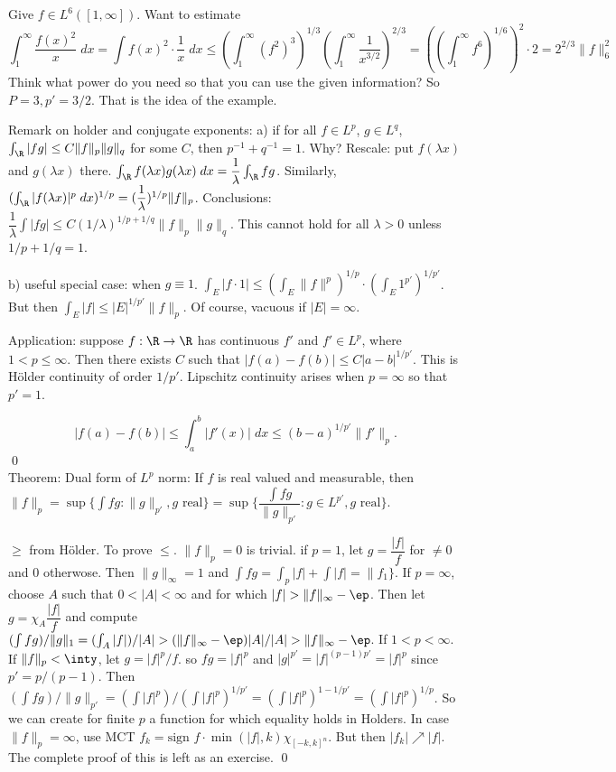 \begin{ex}
Give $f \in L^6([1,\infty])$. Want to estimate
	\[
	\int_1^\infty \dfrac{f(x)^2}{x} \; dx = \int f(x)^2 \cdot \dfrac{1}{x} \; dx  \leq \left(\int_1^\infty (f^2)^3 \right)^{1/3} \left( \int_1^\infty \dfrac{1}{x^{3/2}} \right)^{2/3}= \left(\left(\int_1^\infty f^6 \right)^{1/6} \right)^2 \cdot 2= 2^{2/3} \|f\|_6^2
	\]
Think what power do you need so that you can use the given information? So $P=3, p'= 3/2$. That is the idea of the example. 
\end{ex}







Remark on holder and conjugate exponents:
a) if for all $f \in L^p$, $g \in L^q$, $\int_\R |fg| \leq C \|f\|_p \|g\|_q$ for some $C$, then $p^{-1}+q^{-1}=1$. Why? Rescale: put $f(\lambda x)$ and $g(\lambda x)$ there. $\int_\R f(\lambda x) g(\lambda x) \; dx = \dfrac{1}{\lambda} \int_\R fg$. Similarly, $(\int_\R |f(\lambda x)|^p \; dx)^{1/p}= (\dfrac{1}{\lambda})^{1/p} \|f\|_p$. Conclusions: $\dfrac{1}{\lambda} \int |fg| \leq C (1/\lambda)^{1/p+1/q} \|f\|_p \|g\|_q$. This cannot hold for all $\lambda>0$ unless $1/p+1/q=1$. 

b) useful special case: when $g \equiv 1$. $\int_E |f \cdot 1| \leq (\int_E \|f\|^p)^{1/p} \cdot (\int_E 1^{p'})^{1/p'}$. But then $\int_E |f| \leq |E|^{1/p'} \|f\|_p$. Of course, vacuous if $|E|=\infty$.

Application: suppose $f: \R \to \R$ has continuous $f'$ and $f' \in L^p$, where $1< p \leq \infty$. Then there exists $C$ such that $|f(a)-f(b)| \leq C |a-b|^{1/p'}$. This is H\"older continuity of order $1/p'$. Lipschitz continuity arises when $p=\infty$ so that $p'=1$. 

	\[
	| f(a) - f(b)| \leq \int_a^b |f'(x)| \; dx \leq (b-a)^{1/p'} \|f'\|_p.
	\]
\qed \\


Theorem: Dual form of $L^p$ norm: 
If $f$ is real valued and measurable, then $\|f\|_p = \sup \{ \int fg \colon \|g\|_{p'}, g \text{ real} \}= \sup \{ \dfrac{\int fg}{\|g\|_{p'}} \colon g \in L^{p'}, g \text{ real}\}$. 

\pf $\geq$ from H\"older. To prove $\leq$. $\|f\|_p=0$ is trivial. if $p=1$, let $g = \dfrac{|f|}{f}$ for $\neq 0$ and 0 otherwose. Then $\|g\|_\infty = 1$ and $\int fg = \int_p |f| + \int |f| = \|f_1\}$. If $p=\infty$, choose $A$ such that $0<|A|<\infty$ and for which $|f|>\|f\|_\infty - \ep$. Then let $g = \chi_A \dfrac{|f|}{f}$ and compute $(\int fg)/ \|g\|_1= (\int_A |f|)/|A|> (\|f\|_\infty - \ep)|A|/|A|> \|f\|_\infty - \ep$. If $1<p<\infty$. If $\|f\|_p < \inty$, let $g= |f|^p/f$. so $fg= |f|^p$ and $|g|^{p'}= |f|^{(p-1)p'}= |f|^p$ since $p'= p/(p-1)$. Then $(\int fg) / \|g\|_{p'}= (\int |f|^p)/ (\int |f|^p)^{1/p'}= (\int |f|^p)^{1-1/p'}= (\int |f|^p)^{1/p}$. So we can create for finite $p$ a function for which equality holds in Holders. In case $\|f\|_p= \infty$, use MCT $f_k = \text{sign }f \cdot \min(|f|,k) \chi_{[-k,k]^n}$. But then $|f_k| \nearrow |f|$. The complete proof of this is left as an exercise. \qed \\





